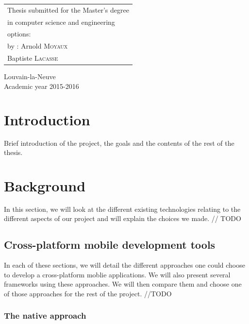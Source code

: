 \documentclass[11pt, a4paper]{report}
\newcommand\nameone{Arnold \textsc{Moyaux}}
\newcommand\nametwo{Baptiste \textsc{Lacasse}}
\newcommand\years{2015-2016}
\begin{document}
\begin{minipage}{.5\textwidth}
\begin{tabular}{l}
Thesis submitted for the Master's degree
\\ in computer science and engineering
\\ options: \
\\ by : \nameone
\\ 	   \nametwo
\end{tabular}
\end{minipage}
\vfill
\begin{center}
Louvain-la-Neuve
\\ Academic year \years
\end{center}

\tableofcontents %
\newpage %


\chapter{Introduction} %

Brief introduction of the project, the goals and the contents of the rest of the thesis.


\chapter{Background}

In this section, we will look at the different existing technologies relating to the different aspects of our project and will explain the choices we made. // TODO

\section{Cross-platform mobile development tools}

In each of these sections, we will detail the different approaches one could choose to develop a cross-platform moblie applications. We will also present several frameworks using these approaches. We will then compare them and choose one of those approaches for the rest of the project. //TODO
\subsection{The native approach}
\end{document}
